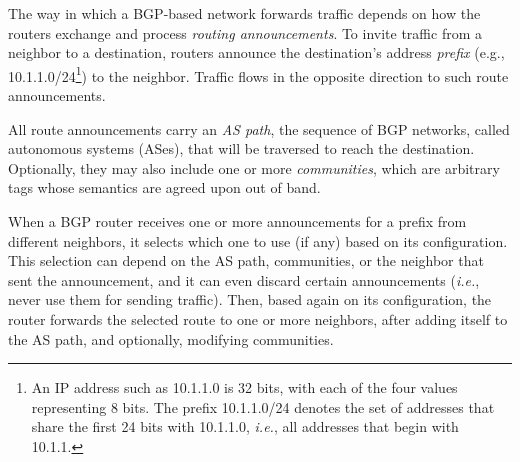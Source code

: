 \documentclass[numbers, 10pt]{sigplanconf}
\newcommand{\IE}{\emph{i.e.}}
\newcommand{\ETC}{\emph{etc.}}
\begin{document}
The way in which a BGP-based network forwards traffic depends on how the routers exchange and process \emph{routing announcements}. To invite traffic from a neighbor to a destination, routers announce the destination's address {\em prefix} (e.g., 10.1.1.0/24\footnote{An IP address
such as 10.1.1.0 is 32 bits, with each of the four values representing 8 bits. The prefix 10.1.1.0/24 denotes the set of addresses that share the first 24 bits with 10.1.1.0, \IE, all addresses that begin with 10.1.1.}) to the neighbor. Traffic flows in the opposite direction to such route announcements.

All route announcements carry an {\em AS path}, the sequence of BGP networks, called autonomous systems (ASes), that will be traversed to reach the destination.
Optionally, they may also include one or more {\em communities}, which are arbitrary tags whose semantics are agreed upon out of band.

When a BGP router receives one or more announcements for a prefix from different neighbors, it selects which one to use (if any) based on its configuration. This selection can depend on the AS path, communities, or the neighbor that sent the announcement, and it can even discard certain announcements (\IE, never use them for sending traffic). Then, based again on its configuration, the router forwards the selected route to one or more neighbors, after adding itself to the AS path, and optionally, modifying communities.

\end{document}
